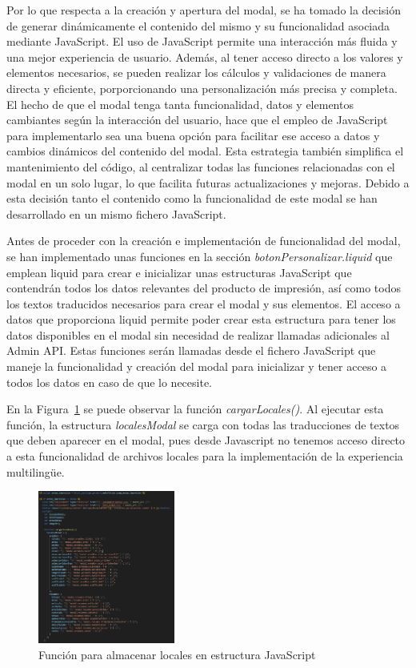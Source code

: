 \documentclass[11pt]{article}
\begin{document}
Por lo que respecta a la creación y apertura del modal, se ha tomado la decisión de generar dinámicamente el contenido del mismo y su funcionalidad
asociada mediante JavaScript. El uso de JavaScript permite una interacción más fluida y una mejor experiencia de usuario. Además, al tener acceso directo 
a los valores y elementos necesarios, se pueden realizar los cálculos y validaciones de manera directa y eficiente, porporcionando una personalización
más precisa y completa. El hecho de que el modal tenga tanta funcionalidad, datos y elementos cambiantes según la interacción del usuario, hace que 
el empleo de JavaScript para implementarlo sea una buena opción para facilitar ese acceso a datos y cambios dinámicos del contenido del modal.
Esta estrategia también simplifica el mantenimiento del código, al centralizar todas las funciones relacionadas con el modal en un solo lugar, lo que facilita
futuras actualizaciones y mejoras. Debido a esta decisión tanto el contenido como la funcionalidad de este modal se han desarrollado en un mismo fichero JavaScript.

Antes de proceder con la creación e implementación de funcionalidad del modal, se han implementado unas funciones en la sección \textit{botonPersonalizar.liquid} que emplean liquid para crear e inicializar unas estructuras JavaScript que 
contendrán todos los datos relevantes del producto de impresión, así como todos los textos traducidos necesarios para crear el modal y sus elementos. El acceso a datos que proporciona liquid permite poder crear 
esta estructura para tener los datos disponibles en el modal sin necesidad de realizar llamadas adicionales al Admin API. Estas funciones serán llamadas desde el fichero 
JavaScript que maneje la funcionalidad y creación del modal para inicializar y tener acceso a todos los datos en caso de que lo necesite.

En la Figura~\ref{fig:cargarlocales} se puede observar la función \textit{cargarLocales()}. Al ejecutar esta función, la estructura \textit{localesModal} se carga con 
todas las traducciones de textos que deben aparecer en el modal, pues desde Javascript no tenemos acceso directo a esta funcionalidad de archivos locales para la implementación 
de la experiencia multilingüe.

\begin{figure}[H]
    \centering
    \includegraphics[width=0.4\textwidth]{imagenesUS3-section/funcioncargarLocales.png}
    \caption{\label{fig:cargarlocales} Función para almacenar locales en estructura JavaScript}
    \vspace{\fill}
\end{figure}
\end{document}

